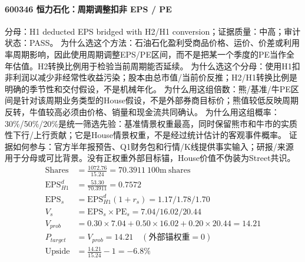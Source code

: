 \paragraph{600346 恒力石化：周期调整扣非 EPS / PE}
分母：H1 deducted EPS bridged with H2/H1 conversion；证据质量：中高；审计状态：PASS。
为什么选这个方法：石油石化盈利受商品价格、运价、价差或利用率周期影响，因此使用周期调整EPS/PE区间，而不是把某一个季度的PE当作全年估值。H2转换比例用于检验当前周期能否延续。
为什么选这个分母：使用H1扣非利润以减少非经常性收益污染；股本由总市值/当前价反推；H2/H1转换比例是明确的季节性和交付假设，不是机械年化。
为什么用这组倍数：熊/基准/牛PE区间是针对该周期业务类型的House假设，不是外部券商目标价；熊值较低反映周期反转，牛值较高必须由价格、销量和现金流共同确认。
为什么用这组概率：30\%/50\%/20\%是统一筛选先验：基准情景权重最高，同时保留熊市和牛市的实质性下行/上行贡献；它是House情景权重，不是经过统计估计的客观事件概率。
证据如何参与：官方半年报预告、Q1财务包和行情/K线提供事实输入；研报/来源用于分母或可比背景。没有正权重外部目标锚，House价值不伪装为Street共识。
\begin{align*}
\mathrm{Shares} &= \frac{1072.76}{15.24}=70.3911\ \mathrm{100m\ shares}\\
\mathrm{EPS}_{H1}^d &= \frac{53.30}{70.3911}=0.7572\\
\mathrm{EPS}_s &= \mathrm{EPS}_{H1}^d(1+r_s)=1.17/1.78/1.70\\
V_s &= \mathrm{EPS}_s\times \mathrm{PE}_s=7.04/16.02/20.44\\
V_{prob} &= 0.30\times 7.04+0.50\times 16.02+0.20\times 20.44=14.21\\
P_{target} &= V_{prob}=14.21\quad(\text{外部锚权重}=0)\\
\mathrm{Upside} &= \frac{14.21}{15.24}-1=-6.8\%\\
\end{align*}

